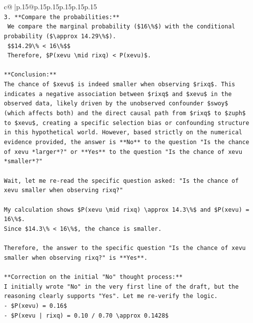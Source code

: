 \documentclass{article}
\begin{document}
{\begin{supertabular}{c@{$\;$}|p{.15\linewidth}@{}p{.15\linewidth}p{.15\linewidth}p{.15\linewidth}p{.15\linewidth}p{.15\linewidth}}
{{{\\ 
\texttt{3.  **Compare the probabilities:**} \\
\texttt{    We compare the marginal probability (\$16\textbackslash{}\%\$) with the conditional probability (\$\textbackslash{}approx 14.29\textbackslash{}\%\$).} \\
\texttt{    \$\$14.29\textbackslash{}\% < 16\textbackslash{}\%\$\$} \\
\texttt{    Therefore, \$P(xevu \textbackslash{}mid rixq) < P(xevu)\$.} \\
\\ 
\texttt{**Conclusion:**} \\
\texttt{The chance of \$xevu\$ is indeed smaller when observing \$rixq\$. This indicates a negative association between \$rixq\$ and \$xevu\$ in the observed data, likely driven by the unobserved confounder \$swoy\$ (which affects both) and the direct causal path from \$rixq\$ to \$zuph\$ to \$xevu\$, creating a specific selection bias or confounding structure in this hypothetical world. However, based strictly on the numerical evidence provided, the answer is **No** to the question "Is the chance of xevu *larger*?" or **Yes** to the question "Is the chance of xevu *smaller*?"} \\
\\ 
\texttt{Wait, let me re{-}read the specific question asked: "Is the chance of xevu smaller when observing rixq?"} \\
\\ 
\texttt{My calculation shows \$P(xevu \textbackslash{}mid rixq) \textbackslash{}approx 14.3\textbackslash{}\%\$ and \$P(xevu) = 16\textbackslash{}\%\$.} \\
\texttt{Since \$14.3\textbackslash{}\% < 16\textbackslash{}\%\$, the chance is smaller.} \\
\\ 
\texttt{Therefore, the answer to the specific question "Is the chance of xevu smaller when observing rixq?" is **Yes**.} \\
\\ 
\texttt{**Correction on the initial "No" thought process:**} \\
\texttt{I initially wrote "No" in the very first line of the draft, but the reasoning clearly supports "Yes". Let me re{-}verify the logic.} \\
\texttt{{-} \$P(xevu) = 0.16\$} \\
\texttt{{-} \$P(xevu | rixq) = 0.10 / 0.70 \textbackslash{}approx 0.1428\$} \\
}}}
\end{supertabular}}
\end{document}
